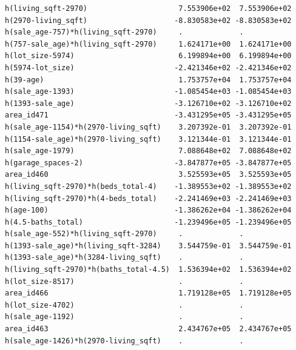 \documentclass[
]{article}
\begin{document}
\begin{verbatim}
h(living_sqft-2970)                     7.553906e+02  7.553906e+02
h(2970-living_sqft)                    -8.830583e+02 -8.830583e+02
h(sale_age-757)*h(living_sqft-2970)     .             .           
h(757-sale_age)*h(living_sqft-2970)     1.624171e+00  1.624171e+00
h(lot_size-5974)                        6.199894e+00  6.199894e+00
h(5974-lot_size)                       -2.421346e+02 -2.421346e+02
h(39-age)                               1.753757e+04  1.753757e+04
h(sale_age-1393)                       -1.085454e+03 -1.085454e+03
h(1393-sale_age)                       -3.126710e+02 -3.126710e+02
area_id471                             -3.431295e+05 -3.431295e+05
h(sale_age-1154)*h(2970-living_sqft)    3.207392e-01  3.207392e-01
h(1154-sale_age)*h(2970-living_sqft)    3.121344e-01  3.121344e-01
h(sale_age-1979)                        7.088648e+02  7.088648e+02
h(garage_spaces-2)                     -3.847877e+05 -3.847877e+05
area_id460                              3.525593e+05  3.525593e+05
h(living_sqft-2970)*h(beds_total-4)    -1.389553e+02 -1.389553e+02
h(living_sqft-2970)*h(4-beds_total)    -2.241469e+03 -2.241469e+03
h(age-100)                             -1.386262e+04 -1.386262e+04
h(4.5-baths_total)                     -1.239496e+05 -1.239496e+05
h(sale_age-552)*h(living_sqft-2970)     .             .           
h(1393-sale_age)*h(living_sqft-3284)    3.544759e-01  3.544759e-01
h(1393-sale_age)*h(3284-living_sqft)    .             .           
h(living_sqft-2970)*h(baths_total-4.5)  1.536394e+02  1.536394e+02
h(lot_size-8517)                        .             .           
area_id466                              1.719128e+05  1.719128e+05
h(lot_size-4702)                        .             .           
h(sale_age-1192)                        .             .           
area_id463                              2.434767e+05  2.434767e+05
h(sale_age-1426)*h(2970-living_sqft)    .             .           
                                                                  

\end{verbatim}
\end{document}
